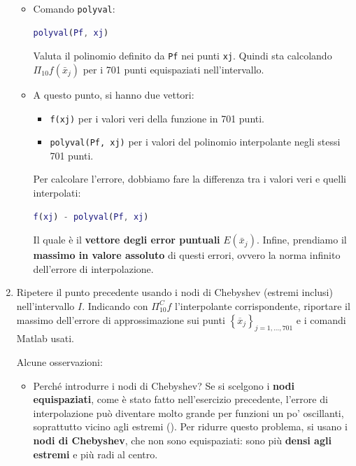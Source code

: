\begin{enumerate}
\begin{itemize}
        \item Comando \texttt{polyval}:
        \begin{lstlisting}[language=MATLAB]
polyval(Pf, xj)\end{lstlisting}
        Valuta il polinomio definito da \texttt{Pf} nei punti \texttt{xj}. Quindi sta calcolando $\Pi_{10} f(\bar{x}_{j})$ per i 701 punti equispaziati nell'intervallo.


        \item A questo punto, si hanno due vettori:
        \begin{itemize}
            \item \texttt{f(xj)} per i valori veri della funzione in 701 punti.
            \item \texttt{polyval(Pf, xj)} per i valori del polinomio interpolante negli stessi 701 punti.
        \end{itemize}
        Per calcolare l'errore, dobbiamo fare la differenza tra i valori veri e quelli interpolati:
        \begin{lstlisting}[language=MATLAB]
f(xj) - polyval(Pf, xj)\end{lstlisting}
        Il quale è il \textbf{vettore degli error puntuali} $E\left(\bar{x}_{j}\right)$. Infine, prendiamo il \textbf{massimo in valore assoluto} di questi errori, ovvero la norma infinito dell'errore di interpolazione.
    \end{itemize}


    \item Ripetere il punto precedente usando i nodi di Chebyshev (estremi inclusi) nell'intervallo $I$. Indicando con $\Pi_{10}^{C}f$ l'interpolante corrispondente, riportare il massimo dell'errore di approssimazione sui punti $\left\{\overline{x}_{j}\right\}_{j = 1, \dots, 701}$ e i comandi Matlab usati.
    
    \begin{remarkbox}
        Alcune osservazioni:
        \begin{itemize}
            \item Perché introdurre i nodi di Chebyshev? Se si scelgono i \textbf{nodi equispaziati}, come è stato fatto nell'esercizio precedente, l'errore di interpolazione può diventare molto grande per funzioni un po' oscillanti, soprattutto vicino agli estremi (). Per ridurre questo problema, si usano i \textbf{nodi di Chebyshev}, che non sono equispaziati: sono più \textbf{densi agli estremi} e più radi al centro.
            

\end{itemize}
\end{remarkbox}
\end{enumerate}
